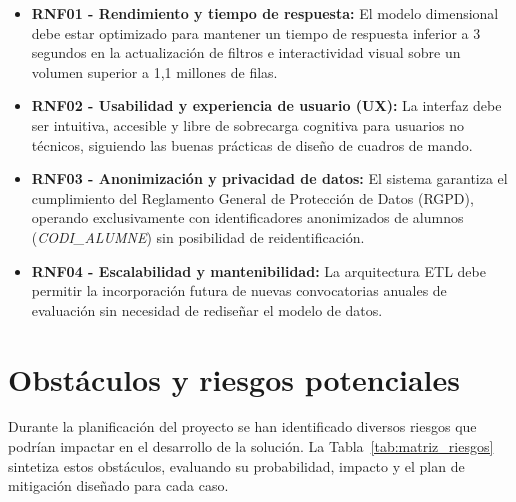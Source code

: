\documentclass[12pt, a4paper, twoside]{report}
\begin{document}
\begin{itemize}
    \item \textbf{RNF01 - Rendimiento y tiempo de respuesta:} El modelo dimensional debe estar optimizado para mantener un tiempo de respuesta inferior a 3 segundos en la actualización de filtros e interactividad visual sobre un volumen superior a 1,1 millones de filas.
    \item \textbf{RNF02 - Usabilidad y experiencia de usuario (UX):} La interfaz debe ser intuitiva, accesible y libre de sobrecarga cognitiva para usuarios no técnicos, siguiendo las buenas prácticas de diseño de cuadros de mando.
    \item \textbf{RNF03 - Anonimización y privacidad de datos:} El sistema garantiza el cumplimiento del Reglamento General de Protección de Datos (RGPD), operando exclusivamente con identificadores anonimizados de alumnos (\textit{CODI\_ALUMNE}) sin posibilidad de reidentificación.
    \item \textbf{RNF04 - Escalabilidad y mantenibilidad:} La arquitectura ETL debe permitir la incorporación futura de nuevas convocatorias anuales de evaluación sin necesidad de rediseñar el modelo de datos.
\end{itemize}

\section{Obstáculos y riesgos potenciales}
Durante la planificación del proyecto se han identificado diversos riesgos que podrían impactar en el desarrollo de la solución. La Tabla~\ref{tab:matriz_riesgos} sintetiza estos obstáculos, evaluando su probabilidad, impacto y el plan de mitigación diseñado para cada caso.
\end{document}
